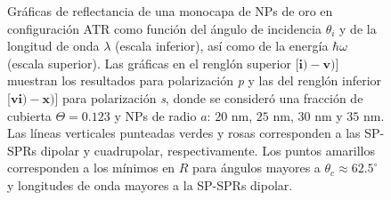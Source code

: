 \begin{figure}[t!]\centering
{}\vspace*{-.5em}
	\caption{Gráficas de reflectancia de una monocapa de NPs de oro en configuración ATR como función del ángulo de incidencia $\theta_i$ y de la longitud de onda $\lambda$ (escala inferior), así como de la energía  $\hbar\omega$ (escala superior).  Las gráficas   en el renglón superior [$\mathbf{i)-v)}$] muestran los resultados para  polarización \emph{p} y las del renglón inferior  [$\mathbf{vi)-x)}$]  para polarización  \emph{s}, donde se consideró una fracción de cubierta $\Theta = 0.123$ y  NPs de radio  $a$: $20$ nm, $25$ nm, $30$ nm y $35$ nm.  Las líneas verticales punteadas verdes y rosas corresponden a las SP-SPRs dipolar y  cuadrupolar, respectivamente.  Los puntos amarillos corresponden a los mínimos en $R$ para ángulos mayores a $\theta_c\approx 62.5^\circ$ y longitudes de onda mayores a la SP-SPRs dipolar.
}	\label{fig:Au-R-Rad}	
	\end{figure}	


